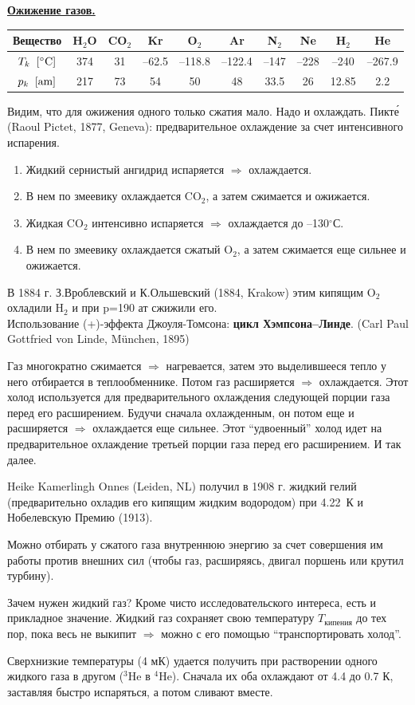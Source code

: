 \documentclass[12pt,epsfig,color,russian]{article}
\begin{document}
\underline{\bf Ожижение газов.}
\begin{center}
\begin{tabular}{|c||c|c|c|c|c|c|c|c|c|}\hline
Вещество                 & H$_2$O & CO$_2$ & Kr & O$_2$ & Ar & N$_2$ & Ne & H$_2$ & He  \\ \hline \hline
 $T_k \;\;[^\circ\rm C]$ & 374 & 31 & --62.5 & --118.8 & --122.4 & --147 & --228 & --240 & --267.9 \\ \hline
 $p_k \;\;[\rm am]$      & 217 & 73 & 54 & 50 & 48 & 33.5 & 26 & 12.85 & 2.2 \\ \hline
\end{tabular}
\end{center}
Видим, что для ожижения одного только сжатия мало. Надо и охлаждать.
\newpage
\noindent
Пикт\'{е} (Raoul Pictet, 1877, Geneva): предварительное охлаждение за счет интенсивного испарения.
\begin{enumerate}
\item Жидкий сернистый ангидрид испаряется $\Rightarrow$ охлаждается.
\item В нем по змеевику охлаждается CO$_2$, а затем сжимается и ожижается.
\item Жидкая CO$_2$ интенсивно испаряется $\Rightarrow$ охлаждается до --130$^\circ$С.
\item В нем по змеевику охлаждается сжатый O$_2$, а затем сжимается еще сильнее и ожижается.
\end{enumerate}
В 1884 г. З.Вроблевский и К.Ольшевский (1884, Krakow) этим кипящим O$_2$ охладили H$_2$ и при p=190 ат сжижили его.\\
Использование (+)-эффекта Джоуля-Томсона: {\bf цикл Хэмпсона--Линде}.
(Carl Paul Gottfried von Linde, M\"{u}nchen, 1895)

Газ многократно сжимается $\Rightarrow$ нагревается, затем это выделившееся тепло у него отбирается в теплообменнике. Потом газ расширяется $\Rightarrow$ охлаждается. Этот холод используется для предварительного охлаждения следующей порции газа перед его расширением. Будучи сначала охлаж\-ден\-ным, он потом еще и расширяется $\Rightarrow$ охлаждается еще сильнее. Этот ``удвоенный'' холод идет на предварительное охлаждение третьей порции газа перед его расширением. И так далее.

Heike Kamerlingh Onnes (Leiden, NL) получил в 1908 г. жидкий гелий (предварительно охладив его кипящим жидким водородом) при 4.22~К и Нобелевскую Премию (1913).

Можно отбирать у сжатого газа внутреннюю энергию за счет совер\-ше\-ния им работы против внешних сил (чтобы газ, расширяясь, двигал поршень или крутил турбину).

Зачем нужен жидкий газ? Кроме чисто исследовательского интереса, есть и прикладное значение. Жидкий газ сохраняет свою температуру $T_{\texttt{кипения}}$ до тех пор, пока весь не выкипит $\Rightarrow$ можно с его помощью ``транспортировать холод''.

Сверхнизкие температуры (4 мК) удается получить при растворении одного жидкого газа в другом ($^3$He в $^4$He). Сначала их оба охлаждают от 4.4 до 0.7 К, заставляя быстро испаряться, а потом сливают вместе.
\end{document}
